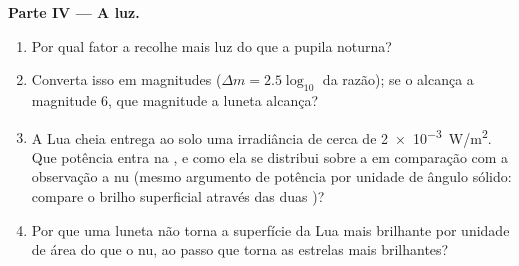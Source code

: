 \begin{problem}
\medskip
\noindent\textbf{Parte IV --- A luz.}
\begin{enumerate}[resume]
  \item Por qual fator a  recolhe mais luz do que a
        pupila noturna?
  \item Converta isso em magnitudes ($\Delta m = 2.5\log_{10}$ da
        razão); se o  alcança a magnitude $6$, que magnitude
        a luneta alcança?
  \item A Lua cheia entrega ao solo uma irradiância de cerca de
        \qty{2e-3}{W/m^2}. Que potência entra na
        , e como ela se distribui sobre a  em comparação com
        a observação a  nu (mesmo argumento de potência por unidade de ângulo sólido:
        compare o brilho superficial através das duas )?
  \item Por que uma luneta não torna a superfície da Lua mais brilhante por
        unidade de área do que o  nu, ao passo que torna as estrelas
        mais brilhantes?
\end{enumerate}


\end{problem}
